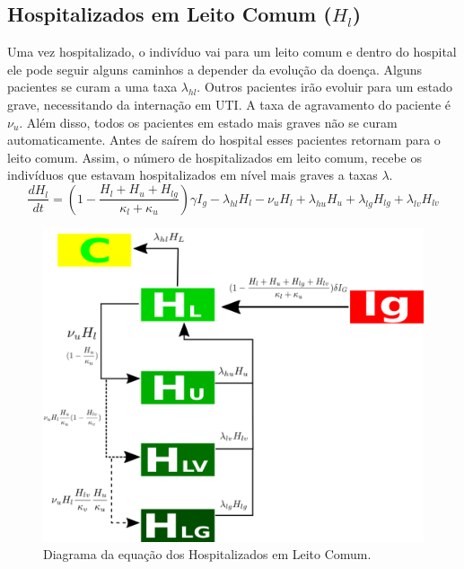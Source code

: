 \documentclass[12pt,letterpaper]{article}
\begin{document}
\subsection{Hospitalizados em Leito Comum ($H_l$)}
Uma vez hospitalizado, o indivíduo vai para um leito comum e dentro do hospital ele pode seguir alguns caminhos a depender da evolução da doença. Alguns pacientes se curam a uma taxa $\lambda_{hl}$. Outros pacientes irão evoluir para um estado grave, necessitando da internação em UTI. A taxa de agravamento do paciente é $\nu_u$. Além disso, todos os pacientes em estado mais graves não se curam automaticamente. Antes de saírem do hospital esses pacientes retornam para o leito comum. Assim, o número de hospitalizados em leito comum, recebe os indivíduos que estavam hospitalizados em nível mais graves a taxas $\lambda$.
\begin{equation}
	\frac{dH_l}{dt}=(1-\frac{H_l+H_u+H_{lg}}{\kappa_l+\kappa_u})\gamma I_g - \lambda_{hl} H_l - \nu_uH_l + \lambda_{hu}H_u +\lambda_{lg}H_{lg} +\lambda_{lv}H_{lv}
\end{equation}
\begin{figure}[!h]
	\centering
	\includegraphics[scale=0.3]{covidHl}
	\caption{Diagrama da equação dos Hospitalizados em Leito Comum.}
	\label{fig:universe}
\end{figure}
\end{document}
